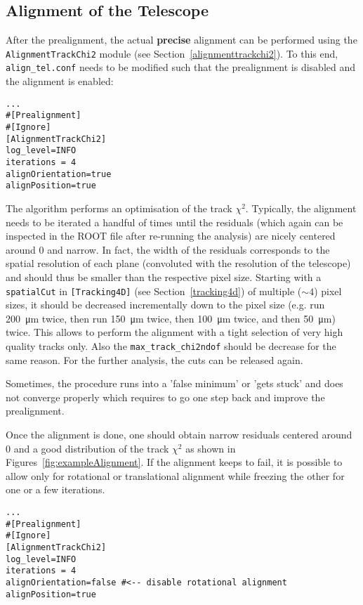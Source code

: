 \subsection*{Alignment of the Telescope}
After the prealignment, the actual \textbf{precise} alignment can be performed using the \texttt{AlignmentTrackChi2} module (see Section~\ref{alignmenttrackchi2}).
To this end, \texttt{align\_tel.conf} needs to be modified such that the prealignment is disabled and the alignment is enabled:
\begin{verbatim}
...
#[Prealignment]
#[Ignore]
[AlignmentTrackChi2]
log_level=INFO
iterations = 4
alignOrientation=true
alignPosition=true
\end{verbatim}

The algorithm performs an optimisation of the track $\chi^2$.
Typically, the alignment needs to be iterated a handful of times until the residuals (which again can be inspected in the ROOT file after re-running the analysis) are nicely centered around 0 and narrow.
In fact, the width of the residuals corresponds to the spatial resolution of each plane (convoluted with the resolution of the telescope) and should thus be smaller than the respective pixel size.
Starting with a \texttt{spatialCut} in \texttt{[Tracking4D]} (see Section~\ref{tracking4d}) of multiple ($\sim4$) pixel sizes, it should be decreased incrementally down to the pixel size (e.g. run \SI{200}{\micro\m} twice, then run \SI{150}{\micro\m} twice, then \SI{100}{\micro\m} twice, and then \SI{50}{\micro\m}) twice.
This allows to perform the alignment with a tight selection of very high quality tracks only.
Also the \texttt{max\_track\_chi2ndof} should be decrease for the same reason.
For the further analysis, the cuts can be released again.

Sometimes, the procedure runs into a 'false minimum' or 'gets stuck' and does not converge properly which requires to go one step back and improve the prealignment.

Once the alignment is done, one should obtain narrow residuals centered around 0 and a good distribution of the track $\chi^2$ as shown in Figures~\ref{fig:exampleAlignment}.
If the alignment keeps to fail, it is possible to allow only for rotational or translational alignment while freezing the other for one or a few iterations.

\begin{verbatim}
...
#[Prealignment]
#[Ignore]
[AlignmentTrackChi2]
log_level=INFO
iterations = 4
alignOrientation=false #<-- disable rotational alignment
alignPosition=true
\end{verbatim}

